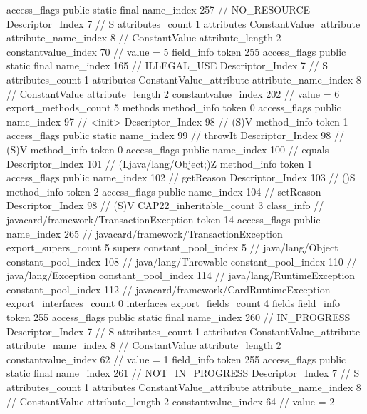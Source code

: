 {{{{{				access_flags	public static final
				name_index	257		// NO_RESOURCE
				Descriptor_Index	7		// S
				attributes_count	1
				attributes {
				ConstantValue_attribute {
					attribute_name_index	8		// ConstantValue
					attribute_length	2
					constantvalue_index	70		// value = 5
				}
				}
			}
			field_info {
				token	255
				access_flags	public static final
				name_index	165		// ILLEGAL_USE
				Descriptor_Index	7		// S
				attributes_count	1
				attributes {
				ConstantValue_attribute {
					attribute_name_index	8		// ConstantValue
					attribute_length	2
					constantvalue_index	202		// value = 6
				}
				}
			}
			}
			export_methods_count	5
			methods {
				method_info {
					token	0
					access_flags	public
					name_index	97		// <init>
					Descriptor_Index	98		// (S)V
				}
				method_info {
					token	1
					access_flags	public static
					name_index	99		// throwIt
					Descriptor_Index	98		// (S)V
				}
				method_info {
					token	0
					access_flags	public
					name_index	100		// equals
					Descriptor_Index	101		// (Ljava/lang/Object;)Z
				}
				method_info {
					token	1
					access_flags	public
					name_index	102		// getReason
					Descriptor_Index	103		// ()S
				}
				method_info {
					token	2
					access_flags	public
					name_index	104		// setReason
					Descriptor_Index	98		// (S)V
				}
			}
			CAP22_inheritable_count	3
		}
		class_info {		// javacard/framework/TransactionException
			token	14
			access_flags	public
			name_index	265		// javacard/framework/TransactionException
			export_supers_count	5
			supers {
				constant_pool_index	5		// java/lang/Object
				constant_pool_index	108		// java/lang/Throwable
				constant_pool_index	110		// java/lang/Exception
				constant_pool_index	114		// java/lang/RuntimeException
				constant_pool_index	112		// javacard/framework/CardRuntimeException
			}
			export_interfaces_count	0
			interfaces {
			}
			export_fields_count	4
			fields {
			field_info {
				token	255
				access_flags	public static final
				name_index	260		// IN_PROGRESS
				Descriptor_Index	7		// S
				attributes_count	1
				attributes {
				ConstantValue_attribute {
					attribute_name_index	8		// ConstantValue
					attribute_length	2
					constantvalue_index	62		// value = 1
				}
				}
			}
			field_info {
				token	255
				access_flags	public static final
				name_index	261		// NOT_IN_PROGRESS
				Descriptor_Index	7		// S
				attributes_count	1
				attributes {
				ConstantValue_attribute {
					attribute_name_index	8		// ConstantValue
					attribute_length	2
					constantvalue_index	64		// value = 2
				}
				}
}}}}}
